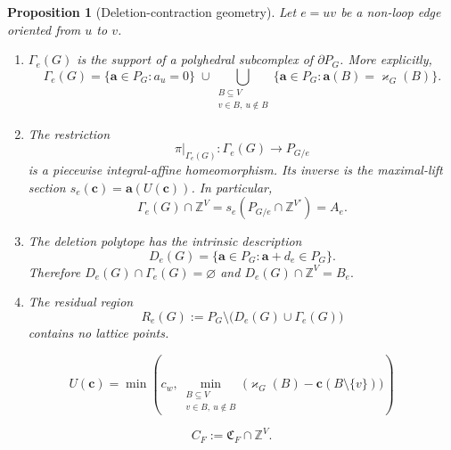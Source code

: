 \documentclass[10pt,a4paper]{amsart}
\newtheorem{proposition}{Proposition}
\newcommand{\ZZ}{\mathbb Z}
\newcommand{\ba}{\mathbf{a}}
\newcommand{\bc}{\mathbf{c}}
\newcommand{\fC}{\mathfrak C}    %
\newcommand{\kp}{\varkappa}
\begin{document}
\begin{proposition}[Deletion-contraction geometry]
\label{prop:polyhedral-section}
Let $e=uv$ be a non-loop edge oriented from $u$ to $v$.
\begin{enumerate}
\item[(i)] $\Gamma_e(G)$ is the support of a polyhedral subcomplex of
$\partial P_G$.  More explicitly,
\begin{equation}
 \Gamma_e(G)=
 \{\ba\in P_G:a_u=0\}
 \;\cup\!
 \bigcup_{\substack{B\subseteq V\\v\in B,\ u\notin B}}
 \{\ba\in P_G:\ba(B)=\kp_G(B)\}.
\label{eq:upper-boundary-faces}
\end{equation}

\item[(ii)] The restriction
\[
   \pi|_{\Gamma_e(G)}:\Gamma_e(G)\longrightarrow P_{G/e}
\]
is a piecewise integral-affine homeomorphism. Its inverse is the maximal-lift
section $s_e(\bc)=\ba(U(\bc))$.  In particular,
\begin{equation}
   \Gamma_e(G)\cap\ZZ^V
   =s_e(P_{G/e}\cap\ZZ^{V'})=A_e.
\label{eq:gamma-lattice-points}
\end{equation}

\item[(iii)] The deletion polytope has the intrinsic description
\begin{equation}
   D_e(G)=\{\ba\in P_G:\ba+d_e\in P_G\}.
\label{eq:deletion-movable}
\end{equation}
Therefore $D_e(G)\cap\Gamma_e(G)=\varnothing$ and  $D_e(G)\cap\ZZ^V=B_e.$

\item[(iv)] The residual region
  \[
   R_e(G):=P_G\setminus\bigl(D_e(G)\cup\Gamma_e(G)\bigr)
  \]
contains no lattice points.
\end{enumerate}
\end{proposition}

\begin{equation}
 U(\bc)=\min\!\left(
 c_w,
 \min_{\substack{B\subseteq V\\v\in B,\ u\notin B}}
 \bigl(\kp_G(B)-\bc(B\setminus\{v\})\bigr)
 \right)
\label{eq:U-piecewise-linear}
\end{equation}

\begin{equation}  \label{eq:cells}
  C_F:=\fC_F\cap\ZZ^V.
\end{equation}
\end{document}
